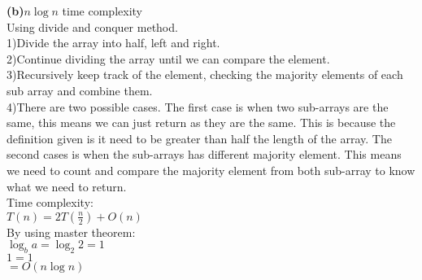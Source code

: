\documentclass[a4paper, 11pt]{article}
\renewcommand{\part}[1] {\vspace{.10in} {\bf (#1)}}
\begin{document}
\part{b}{$n\log n$ time complexity}\\
Using divide and conquer method.\\
1)Divide the array into half, left and right.\\
2)Continue dividing the array until we can compare the element.\\
3)Recursively keep track of the element, checking the majority elements of each sub array and combine them.\\
4)There are two possible cases. The first case is when two sub-arrays are the same, this means we can just return as they are the same. This is because the definition given is it need to be greater than half the length of the array. The second cases is when the sub-arrays has different majority element. This means we need to count and compare the majority element from both sub-array to know what we need to return.\\
Time complexity:\\
$T(n) = 2T(\frac{n}{2})+O(n)$\\
By using master theorem:\\
$\log_{b} a = \log_{2} 2 = 1$\\
$1 = 1$\\
$= O(n\log n)$
\end{document}
